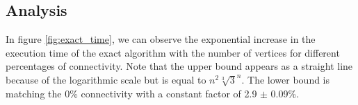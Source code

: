 \subsection{Analysis}

In figure \ref{fig:exact_time}, we can observe the exponential increase in the
execution time of the exact algorithm with the number of vertices for different
percentages of connectivity. Note that the upper bound appears as a straight
line because of the logarithmic scale but is equal to $n^2\sqrt[3]{3}^n$. The
lower bound is matching the 0\% connectivity with a constant factor of
2.9 $\pm$ 0.09\%.

